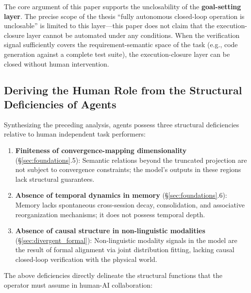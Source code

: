 \documentclass[11pt,a4paper]{article}
\theoremstyle{definition}
\begin{document}
The core argument of this paper supports the unclosability of the \textbf{goal-setting layer}. The precise scope of the thesis ``fully autonomous closed-loop operation is unclosable'' is limited to this layer---this paper does not claim that the execution-closure layer cannot be automated under any conditions. When the verification signal sufficiently covers the requirement-semantic space of the task (e.g., code generation against a complete test suite), the execution-closure layer can be closed without human intervention.

\subsection{Deriving the Human Role from the Structural Deficiencies of Agents}

Synthesizing the preceding analysis, agents possess three structural deficiencies relative to human independent task performers:

\begin{enumerate}[leftmargin=*,itemsep=0.3em]
    \item \textbf{Finiteness of convergence-mapping dimensionality} (\S\ref{sec:foundations}.5): Semantic relations beyond the truncated projection are not subject to convergence constraints; the model's outputs in these regions lack structural guarantees.
    \item \textbf{Absence of temporal dynamics in memory} (\S\ref{sec:foundations}.6): Memory lacks spontaneous cross-session decay, consolidation, and associative reorganization mechanisms; it does not possess temporal depth.
    \item \textbf{Absence of causal structure in non-linguistic modalities} (\S\ref{sec:divergent_formal}): Non-linguistic modality signals in the model are the result of formal alignment via joint distribution fitting, lacking causal closed-loop verification with the physical world.
\end{enumerate}

The above deficiencies directly delineate the structural functions that the operator must assume in human-AI collaboration:
\end{document}
